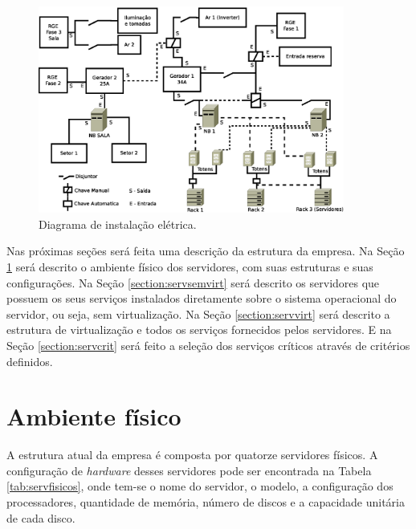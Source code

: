 \begin{figure}[h!]
 \centering
 \includegraphics[width=380px]{img/insteletrica.eps}
 \caption{Diagrama de instalação elétrica.}
 \label{fig:insteletrica}
\end{figure}

Nas próximas seções será feita uma descrição da estrutura da empresa. Na Seção \ref{section:ambiente} será descrito o ambiente físico dos 
servidores, com suas estruturas e suas configurações. Na Seção \ref{section:servsemvirt} será descrito os servidores que possuem os seus
serviços instalados diretamente sobre o sistema operacional do servidor, ou seja, sem virtualização.
Na Seção \ref{section:servvirt} será descrito a estrutura de virtualização e todos os serviços fornecidos pelos servidores. 
E na Seção \ref{section:servcrit} será feito a seleção dos serviços críticos através de critérios definidos.

\section{Ambiente físico}
\label{section:ambiente}

A estrutura atual da empresa é composta por quatorze servidores físicos. 
A configuração de \textit{hardware} desses servidores pode ser encontrada na Tabela \ref{tab:servfisicos}, onde tem-se o nome do servidor, 
o modelo, a configuração dos processadores, quantidade de memória, número de discos e a capacidade unitária de cada disco.

